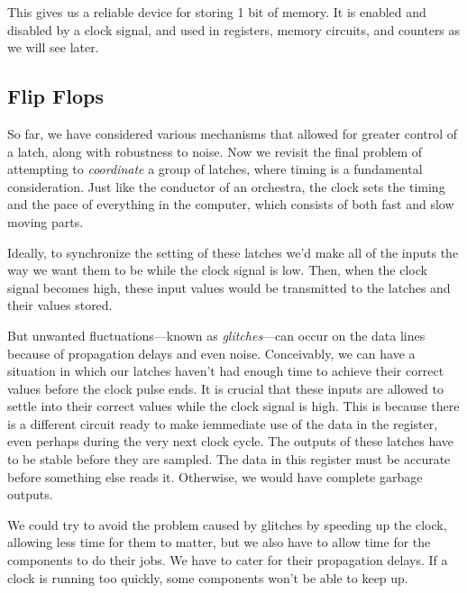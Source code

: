   This gives us a reliable device for storing 1 bit of memory. It is enabled and disabled by a clock signal, and used in registers, memory circuits, and counters as we will see later. 

\subsection{Flip Flops}

  So far, we have considered various mechanisms that allowed for greater control of a latch, along with robustness to noise. Now we revisit the final problem of attempting to \textit{coordinate} a group of latches, where timing is a fundamental consideration. Just like the conductor of an orchestra, the clock sets the timing and the pace of everything in the computer, which consists of both fast and slow moving parts. 

  \begin{figure}[H]
    \centering 
    \caption{}
  \end{figure}

  Ideally, to synchronize the setting of these latches we'd make all of the inputs the way we want them to be while the clock signal is low. Then, when the clock signal becomes high, these input values would be transmitted to the latches and their values stored. 

  But unwanted fluctuations---known as \textit{glitches}---can occur on the data lines because of propagation delays and even noise.  Conceivably, we can have a situation in which our latches haven't had enough time to achieve their correct values before the clock pulse ends. It is crucial that these inputs are allowed to settle into their correct values while the clock signal is high. This is because there is a different circuit ready to make iemmediate use of the data in the register, even perhaps during the very next clock cycle. The outputs of these latches have to be stable before they are sampled. The data in this register must be accurate before something else reads it. Otherwise, we would have complete garbage outputs. 

  We could try to avoid the problem caused by glitches by speeding up the clock, allowing less time for them to matter, but we also have to allow time for the components to do their jobs. We have to cater for their propagation delays. If a clock is running too quickly, some components won't be able to keep up. 

